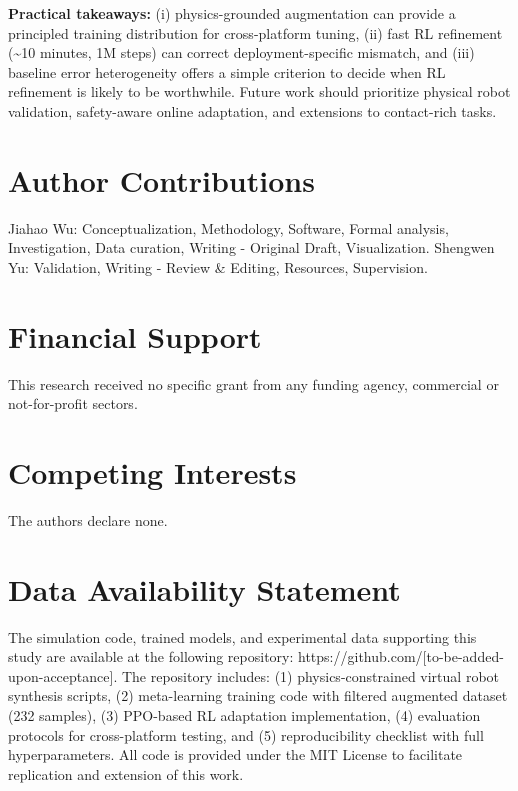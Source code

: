 \documentclass[a4paper]{cas-sc}
\begin{document}
            	\textbf{Practical takeaways:} (i) physics-grounded augmentation can provide a principled training distribution for cross-platform tuning, (ii) fast RL refinement (\textasciitilde10 minutes, 1M steps) can correct deployment-specific mismatch, and (iii) baseline error heterogeneity offers a simple criterion to decide when RL refinement is likely to be worthwhile. Future work should prioritize physical robot validation, safety-aware online adaptation, and extensions to contact-rich tasks.


\section*{Author Contributions}

Jiahao Wu: Conceptualization, Methodology, Software, Formal analysis, Investigation, Data curation, Writing - Original Draft, Visualization. Shengwen Yu: Validation, Writing - Review \& Editing, Resources, Supervision.

\section*{Financial Support}

This research received no specific grant from any funding agency, commercial or not-for-profit sectors.

\section*{Competing Interests}

The authors declare none.

\section*{Data Availability Statement}

The simulation code, trained models, and experimental data supporting this study are available at the following repository: https://github.com/[to-be-added-upon-acceptance]. The repository includes: (1) physics-constrained virtual robot synthesis scripts, (2) meta-learning training code with filtered augmented dataset (232 samples), (3) PPO-based RL adaptation implementation, (4) evaluation protocols for cross-platform testing, and (5) reproducibility checklist with full hyperparameters. All code is provided under the MIT License to facilitate replication and extension of this work.
\end{document}
